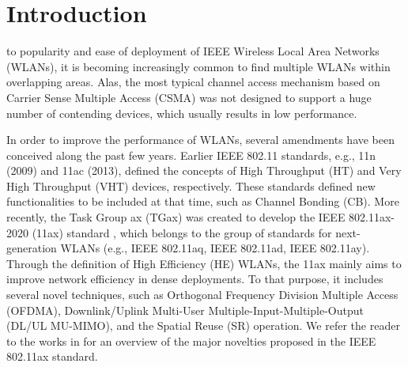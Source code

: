 \documentclass[comsoc]{IEEEtran}
\begin{document}
	\section{Introduction}
	\label{section:intro}
	
	
	 to popularity and ease of deployment of IEEE Wireless Local Area Networks (WLANs), it is becoming increasingly common to find multiple WLANs within overlapping areas. Alas, the most typical channel access mechanism based on Carrier Sense Multiple Access (CSMA) was not designed to support a huge number of contending devices, which usually results in low performance.
	
	In order to improve the performance of WLANs, several amendments have been conceived along the past few years. Earlier IEEE 802.11 standards, e.g., 11n (2009) and 11ac (2013), defined the concepts of High Throughput (HT) and Very High Throughput (VHT) devices, respectively. These standards defined new functionalities to be included at that time, such as Channel Bonding (CB). More recently, the Task Group ax (TGax) was created to develop the IEEE 802.11ax-2020 (11ax) standard \cite{tgax2019draft}, which belongs to the group of standards for next-generation WLANs (e.g., IEEE 802.11aq, IEEE 802.11ad, IEEE 802.11ay). Through the definition of High Efficiency (HE) WLANs, the 11ax mainly aims to improve network efficiency in dense deployments. To that purpose, it includes several novel techniques, such as Orthogonal Frequency Division Multiple Access (OFDMA), Downlink/Uplink Multi-User Multiple-Input-Multiple-Output (DL/UL MU-MIMO), and the Spatial Reuse (SR) operation. We refer the reader to the works in \cite{bellalta2016ieee, afaqui2016ieee, qu2018survey, khorov2018tutorial} for an overview of the major novelties proposed in the IEEE 802.11ax standard.
	
\end{document}
